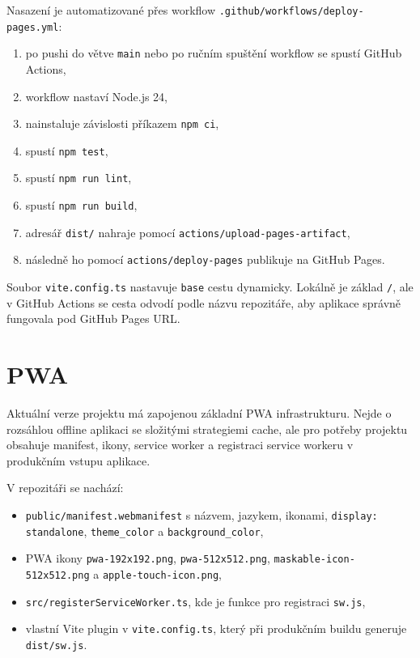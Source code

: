 \documentclass[12pt,a4paper]{article}
\begin{document}
Nasazení je automatizované přes workflow \texttt{.github/workflows/deploy-pages.yml}:
\begin{enumerate}[leftmargin=2em]
  \item po pushi do větve \texttt{main} nebo po ručním spuštění workflow se spustí GitHub Actions,
  \item workflow nastaví Node.js 24,
  \item nainstaluje závislosti příkazem \texttt{npm ci},
  \item spustí \texttt{npm test},
  \item spustí \texttt{npm run lint},
  \item spustí \texttt{npm run build},
  \item adresář \texttt{dist/} nahraje pomocí \texttt{actions/upload-pages-artifact},
  \item následně ho pomocí \texttt{actions/deploy-pages} publikuje na GitHub Pages.
\end{enumerate}

Soubor \texttt{vite.config.ts} nastavuje \texttt{base} cestu dynamicky. Lokálně je základ \texttt{/}, ale v GitHub Actions se cesta odvodí podle názvu repozitáře, aby aplikace správně fungovala pod GitHub Pages URL.

\section{PWA}

Aktuální verze projektu má zapojenou základní PWA infrastrukturu. Nejde o rozsáhlou offline aplikaci se složitými strategiemi cache, ale pro potřeby projektu obsahuje manifest, ikony, service worker a registraci service workeru v produkčním vstupu aplikace.

V repozitáři se nachází:
\begin{itemize}[leftmargin=2em]
  \item \texttt{public/manifest.webmanifest} s názvem, jazykem, ikonami, \texttt{display: standalone}, \texttt{theme\_color} a \texttt{background\_color},
  \item PWA ikony \texttt{pwa-192x192.png}, \texttt{pwa-512x512.png}, \texttt{maskable-icon-512x512.png} a \texttt{apple-touch-icon.png},
  \item \texttt{src/registerServiceWorker.ts}, kde je funkce pro registraci \texttt{sw.js},
  \item vlastní Vite plugin v \texttt{vite.config.ts}, který při produkčním buildu generuje \texttt{dist/sw.js}.
\end{itemize}
\end{document}
